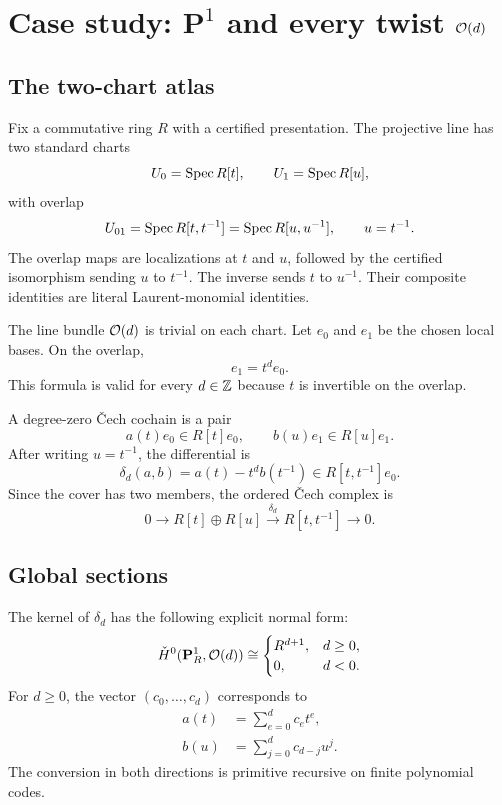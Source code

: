 \section{Case study: \texorpdfstring{$\mathbf P^1$}{P1} and every twist \texorpdfstring{$\mathcal O(d)$}{O(d)}}

\subsection{The two-chart atlas}

Fix a commutative ring $R$ with a certified presentation.  The projective line has two standard
charts
\[
   U_0=\operatorname{Spec} R[t],\qquad U_1=\operatorname{Spec} R[u],
\]
with overlap
\[
   U_{01}=\operatorname{Spec} R[t,t^{-1}]=\operatorname{Spec} R[u,u^{-1}],
   \qquad u=t^{-1}.
\]
The overlap maps are localizations at $t$ and $u$, followed by the certified isomorphism sending
$u$ to $t^{-1}$.  The inverse sends $t$ to $u^{-1}$.  Their composite identities are literal
Laurent-monomial identities.

The line bundle $\mathcal O(d)$ is trivial on each chart.  Let $e_0$ and $e_1$ be the chosen local bases.
On the overlap,
\[
                         e_1=t^d e_0.
\]
This formula is valid for every $d\in\mathbb Z$ because $t$ is invertible on the overlap.

A degree-zero \v{C}ech cochain is a pair
\[
                   a(t)e_0\in R[t]e_0,
              \qquad b(u)e_1\in R[u]e_1.
\]
After writing $u=t^{-1}$, the differential is
\begin{equation}\label{eq:p1-delta}
  \delta_d(a,b)=a(t)-t^d b(t^{-1})
        \in R[t,t^{-1}]e_0.
\end{equation}
Since the cover has two members, the ordered \v{C}ech complex is
\[
  0\longrightarrow R[t]\oplus R[u]
    \xrightarrow{\delta_d} R[t,t^{-1}]
    \longrightarrow0.
\]

\subsection{Global sections}

\begin{theorem}\label{thm:p1-h0}
The kernel of $\delta_d$ has the following explicit normal form:
\[
 \check H^0(\mathbf P^1_R,\mathcal O(d))\cong
 \begin{cases}
   R^{d+1},& d\geq0,\\
   0,&d<0.
 \end{cases}
\]
For $d\geq0$, the vector $(c_0,\ldots,c_d)$ corresponds to
\begin{align*}
 a(t)&=\sum_{e=0}^d c_e t^e,\\
 b(u)&=\sum_{j=0}^d c_{d-j}u^j.
\end{align*}
The conversion in both directions is primitive recursive on finite polynomial codes.
\end{theorem}

